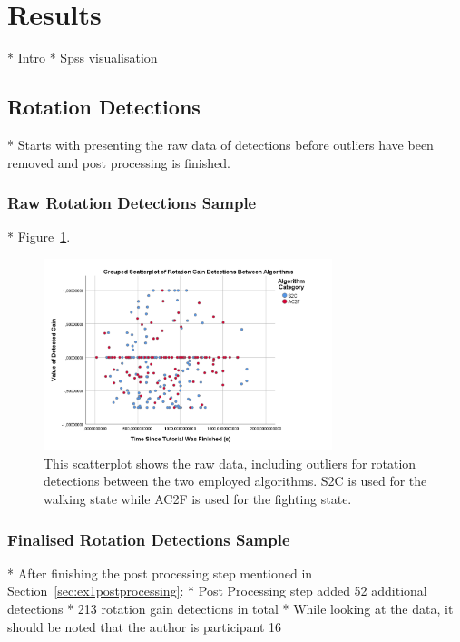 \section{Results}\label{sec:ex1results}
* Intro
* Spss visualisation

\subsection{Rotation Detections}
* Starts with presenting the raw data of detections before outliers have been removed and post processing is finished. 



\subsubsection{Raw Rotation Detections Sample}
* Figure~\ref{fig:rawRotationDetectionData}.
\begin{figure}[tbph]
    \centering
    \includegraphics[width=0.75\textwidth]{figures/graphs/RawRotationDetections.png}
    \caption[Raw Detection Scatterplot For Rotation Gains]{This scatterplot shows the raw data, including outliers for rotation detections between the two employed algorithms. S2C is used for the walking state while AC2F is used for the fighting state.}
    \label{fig:rawRotationDetectionData}
\end{figure}


\subsubsection{Finalised Rotation Detections Sample}
* After finishing the post processing step mentioned in Section~\ref{sec:ex1postprocessing}:
   * Post Processing step added 52 additional detections
* 213 rotation gain detections in total
* While looking at the data, it should be noted that the author is participant 16

